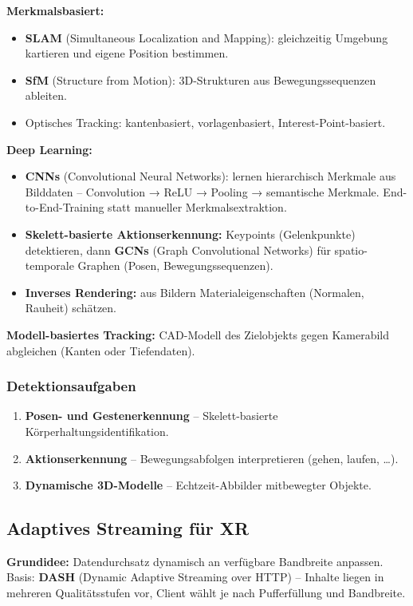 \documentclass[12pt, a4paper]{article}
\begin{document}
\textbf{Merkmalsbasiert:}
\begin{itemize}
  \item \textbf{SLAM} (Simultaneous Localization and Mapping): gleichzeitig Umgebung kartieren und eigene Position bestimmen.
  \item \textbf{SfM} (Structure from Motion): 3D-Strukturen aus Bewegungssequenzen ableiten.
  \item Optisches Tracking: kantenbasiert, vorlagenbasiert, Interest-Point-basiert.
\end{itemize}

\textbf{Deep Learning:}
\begin{itemize}
  \item \textbf{CNNs} (Convolutional Neural Networks): lernen hierarchisch Merkmale aus Bilddaten -- Convolution → ReLU → Pooling → semantische Merkmale. End-to-End-Training statt manueller Merkmalsextraktion.
  \item \textbf{Skelett-basierte Aktionserkennung:} Keypoints (Gelenkpunkte) detektieren, dann \textbf{GCNs} (Graph Convolutional Networks) für spatio-temporale Graphen (Posen, Bewegungssequenzen).
  \item \textbf{Inverses Rendering:} aus Bildern Materialeigenschaften (Normalen, Rauheit) schätzen.
\end{itemize}

\textbf{Modell-basiertes Tracking:} CAD-Modell des Zielobjekts gegen Kamerabild abgleichen (Kanten oder Tiefendaten).

\subsubsection*{Detektionsaufgaben}
\begin{enumerate}
  \item \textbf{Posen- und Gestenerkennung} -- Skelett-basierte Körperhaltungsidentifikation.
  \item \textbf{Aktionserkennung} -- Bewegungsabfolgen interpretieren (gehen, laufen, \dots).
  \item \textbf{Dynamische 3D-Modelle} -- Echtzeit-Abbilder mitbewegter Objekte.
\end{enumerate}

\subsection{Adaptives Streaming für XR}

\textbf{Grundidee:} Datendurchsatz dynamisch an verfügbare Bandbreite anpassen. Basis: \textbf{DASH} (Dynamic Adaptive Streaming over HTTP) -- Inhalte liegen in mehreren Qualitätsstufen vor, Client wählt je nach Pufferfüllung und Bandbreite.
\end{document}
